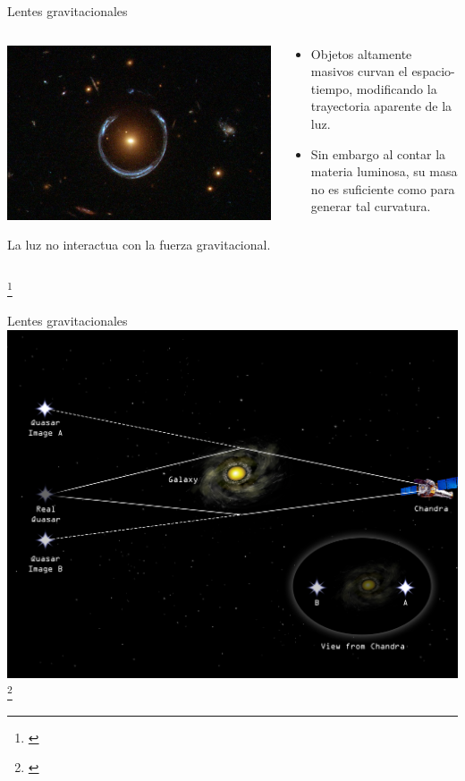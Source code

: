 \documentclass[handout]{beamer}
\newcommand\blfootnote[1]
{%
	\begingroup
	\renewcommand\thefootnote{}\footnote{#1}%
	\addtocounter{footnote}{-1}%
	\endgroup
}
\newcommand{\fcite}[1]{\blfootnote{\cite{#1}}}
\begin{document}
\begin{frame}{Lentes gravitacionales}
	\begin{columns}
		\begin{column}{0.6\textwidth}
			\includegraphics[width=\linewidth]{sources/images/Einstein_Ring.jpg}
			
			La luz no interactua con la fuerza gravitacional.
		\end{column}
		\begin{column}{0.4\textwidth}
			\begin{itemize}
				\item Objetos altamente masivos curvan el espacio-tiempo, modificando la trayectoria aparente de la luz.
				\item Sin embargo al contar la materia luminosa, su masa no es suficiente como para generar tal curvatura.
			\end{itemize}
		\end{column}
	\end{columns}
	\fcite{shirasaki2015probing}
\end{frame}

\begin{frame}{Lentes gravitacionales}
	\includegraphics[width = 0.7\linewidth]{sources/images/lens.jpg}
	\fcite{digest_2018}
\end{frame}
\end{document}
